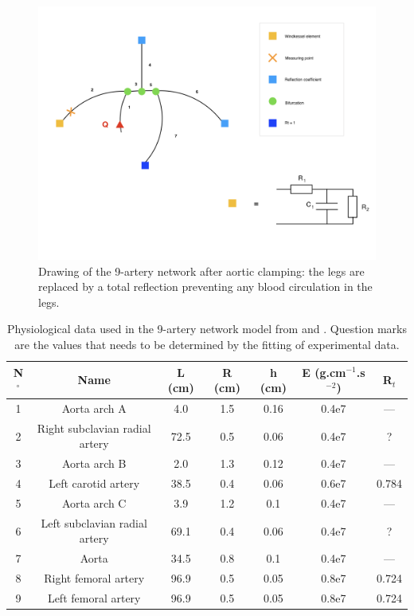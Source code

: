 \documentclass{config}
\begin{document}
\begin{figure}[H]
\centering
\includegraphics[scale=0.35]{Figures/Schema_post.png}
\caption{Drawing of the 9-artery network after aortic clamping: the legs are replaced by a total reflection preventing any blood circulation in the legs.}
\label{schema_post}
\end{figure}

\begin{table}[H]
\begin{center}
\begin{tabular}{|c|c|c|c|c|c|c|}
\hline
N$^\circ$ & Name & L  (cm) & R (cm) & h (cm) & E (g.cm$^{-1}$.s$^{-2}$) & R$_t$ \\ 
\hline 
\hline
1 & Aorta arch A & 4.0 & 1.5 & 0.16 & 0.4e7 & ---\\
\hline 
2 & Right subclavian radial artery & 72.5 & 0.5 & 0.06 & 0.4e7 & ?  \\
\hline
3 & Aorta arch B & 2.0 & 1.3 & 0.12 & 0.4e7 &--- \\
\hline 
4 & Left carotid artery & 38.5 & 0.4 & 0.06 & 0.6e7 & 0.784 \\
\hline 
5 & Aorta arch C & 3.9 & 1.2 & 0.1 & 0.4e7 &---\\
\hline 
6 & Left subclavian radial artery & 69.1 & 0.4 & 0.06 & 0.4e7 & ?\\
\hline
7 & Aorta & 34.5  & 0.8 & 0.1 &0.4e7 & --- \\
\hline 
8 & Right femoral artery & 96.9 & 0.5 & 0.05 & 0.8e7 &0.724\\
\hline 
9 & Left femoral artery & 96.9  & 0.5 & 0.05 &0.8e7 &0.724 \\
\hline
\end{tabular}
\caption{Physiological data used in the 9-artery network model from \cite{bypass} and \cite{Saito9}. Question marks are the values that needs to be determined by the fitting of experimental data.}
\label{network}
\end{center}
\end{table}
\end{document}
